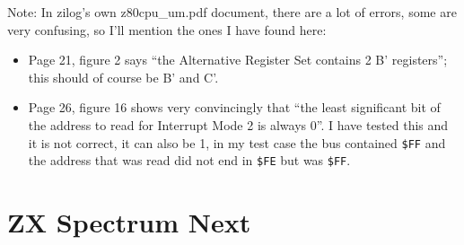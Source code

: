 \documentclass[12pt,twoside,openright,a4paper]{book}
\newcommand{\notet}{\rule{0pt}{2.4ex}}
\begin{document}
Note: In zilog's own z80cpu\_um.pdf document, there are a lot of errors, some are very confusing, so I'll mention the ones I have found here:

\begin{itemize}

	\item
	Page 21, figure 2 says ``the Alternative Register Set contains 2 B' registers''; this should of course be B' and C'.  

	\item
	Page 26, figure 16 shows very convincingly that ``the least significant bit of the address to read for Interrupt Mode 2 is always 0''. I have tested this and it is not correct, it can also be 1, in my test case the bus contained {\tt \$FF} and the address that was read did not end in {\tt \$FE} but was {\tt \$FF}.
  
\end{itemize}



\chapter{ZX Spectrum Next}


\environbodyname\NEXTPORTBODY
{}
\newcommand{\PortBits}[1]{\tt #1\notet &}
\newcommand{\PortDesc}[1]{#1 \\}
\newcommand{\PortDescOnly}[1]{& \PortDesc{#1}}
\end{document}
